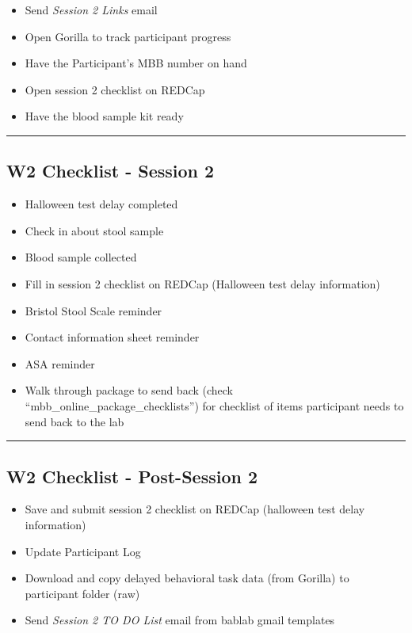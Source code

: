 \documentclass[
]{book}
\providecommand{\tightlist}{%
  \setlength{\itemsep}{0pt}\setlength{\parskip}{0pt}}
\begin{document}
\begin{itemize}
\tightlist
\item
  Send \emph{Session 2 Links} email
\item
  Open Gorilla to track participant progress
\item
  Have the Participant's MBB number on hand
\item
  Open session 2 checklist on REDCap
\item
  Have the blood sample kit ready
\end{itemize}

\begin{center}\rule{0.5\linewidth}{0.5pt}\end{center}

\hypertarget{w2-checklist---session-2}{%
\subsection{W2 Checklist - Session 2}\label{w2-checklist---session-2}}

\begin{itemize}
\tightlist
\item
  Halloween test delay completed
\item
  Check in about stool sample
\item
  Blood sample collected\\
\item
  Fill in session 2 checklist on REDCap (Halloween test delay information)
\item
  Bristol Stool Scale reminder
\item
  Contact information sheet reminder
\item
  ASA reminder
\item
  Walk through package to send back (check ``mbb\_online\_package\_checklists'') for checklist of items participant needs to send back to the lab
\end{itemize}

\begin{center}\rule{0.5\linewidth}{0.5pt}\end{center}

\hypertarget{w2-checklist---post-session-2}{%
\subsection{W2 Checklist - Post-Session 2}\label{w2-checklist---post-session-2}}

\begin{itemize}
\tightlist
\item
  Save and submit session 2 checklist on REDCap (halloween test delay information)
\item
  Update Participant Log
\item
  Download and copy delayed behavioral task data (from Gorilla) to participant folder (raw)
\item
  Send \emph{Session 2 TO DO List} email from bablab gmail templates
\end{itemize}
\end{document}
